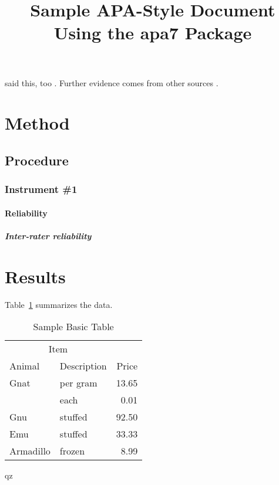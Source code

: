\documentclass[jou,floatsintext]{apa7}
\title{Sample APA-Style Document Using the \textsf{apa7} Package}
\begin{document}
\maketitle

\Textcite{vonDavier2011} said this,
too \parencite{vonDavier2011,Lassen2006}.  Further evidence comes from
other sources \parencite{Shotton1989,Lassen2006}.  \lipsum[3]

\section{Method}


\subsection{Procedure}


\subsubsection{Instrument \#1}
\lipsum[8]

\paragraph{Reliability}
\lipsum[9]

\subparagraph{Inter-rater reliability}
\lipsum[10]


\section{Results}
Table~\ref{tab:BasicTable} summarizes the data. \lipsum[15]

\begin{table}
  \caption{Sample Basic Table}
  \label{tab:BasicTable}
  \begin{tabular}{@{}llr@{}}         \toprule
  \multicolumn{2}{c}{Item}        \\ \cmidrule(r){1-2}
  Animal    & Description & Price \\ \midrule
  Gnat      & per gram    & 13.65 \\
            & each        &  0.01 \\
  Gnu       & stuffed     & 92.50 \\
  Emu       & stuffed     & 33.33 \\
  Armadillo & frozen      &  8.99 \\ \bottomrule
  \end{tabular}qz
\end{table}
\end{document}
